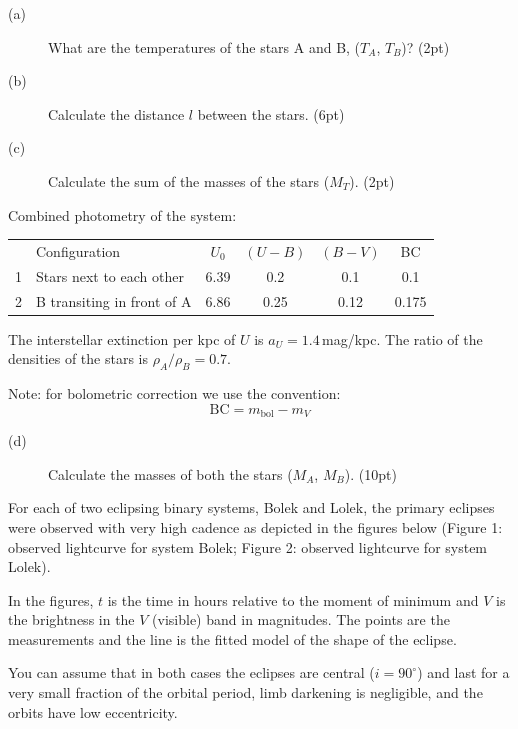 \begin{description}
\item[(a)] What are the temperatures of the stars A and B, ($T_A$, $T_B$)?
  \hfill(2pt)
\item[(b)] Calculate the distance $l$ between the stars. \hfill(6pt)
\item[(c)] Calculate the sum of the masses of the stars ($M_T$). \hfill(2pt)
\end{description}

Combined photometry of the system:

\begin{center}
\begin{tabular}{clcccc}
 & Configuration & $U_0$ & $(U-B)$ & $(B-V)$ & BC \\
1 & Stars next to each other & 6.39 & 0.2 & 0.1 & 0.1 \\
2 & B transiting in front of A & 6.86 & 0.25 & 0.12 & 0.175 \\
\end{tabular}
\end{center}

The interstellar extinction per kpc of $U$ is $a_U = 1.4$\,mag/kpc. The
ratio of the densities of the stars is $\rho_A/\rho_B = 0.7$.

Note: for bolometric correction we use the convention:
\[ \mathrm{BC} = m_{\mathrm{bol}} - m_V \]

\begin{description}
\item[(d)] Calculate the masses of both the stars ($M_A$, $M_B$).
  \hfill(10pt)
\end{description}

For each of two eclipsing binary systems, Bolek and Lolek, the primary
eclipses were observed with very high cadence as depicted in the figures
below (Figure 1: observed lightcurve for system Bolek; Figure 2: observed
lightcurve for system Lolek).

In the figures, $t$ is the time in hours relative to the moment of minimum
and $V$ is the brightness in the $V$ (visible) band in magnitudes. The points
are the measurements and the line is the fitted model of the shape of the
eclipse.

You can assume that in both cases the eclipses are central ($i = 90^\circ$)
and last for a very small fraction of the orbital period, limb darkening is
negligible, and the orbits have low eccentricity.


